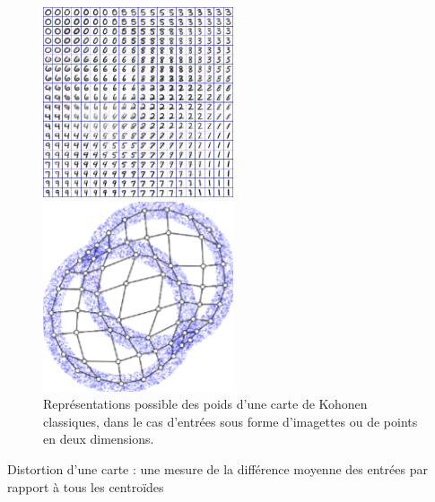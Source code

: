 \begin{figure}
\begin{minipage}{0.5\textwidth}
\centering
\includegraphics[width=0.5\textwidth]{digits.jpg}
\end{minipage}
\begin{minipage}{0.5\textwidth}
\centering
\includegraphics[width=0.5\textwidth]{points.png}
\end{minipage}
\label{fig:representation}
\caption{Représentations possible des poids d'une carte de Kohonen classiques, dans le cas d'entrées sous forme d'imagettes ou de points en deux dimensions.}
\end{figure}

Distortion d'une carte : une mesure de la différence moyenne des entrées par rapport à tous les centroïdes




%
 
